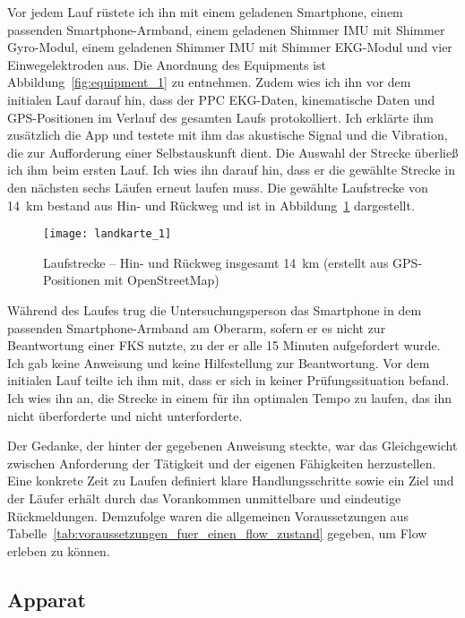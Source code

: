 Vor jedem Lauf rüstete ich ihn mit einem geladenen Smartphone, einem passenden Smartphone-Armband, einem geladenen Shimmer \ac{IMU} mit Shimmer Gyro-Modul, einem geladenen Shimmer \ac{IMU} mit Shimmer \ac{EKG}-Modul und vier Einwegelektroden aus. Die Anordnung des Equipments ist Abbildung~\ref{fig:equipment_1} zu entnehmen. Zudem wies ich ihn vor dem initialen Lauf darauf hin, dass der \ac{PPC} \ac{EKG}-Daten, kinematische Daten und \acs{GPS}-Positionen im Verlauf des gesamten Laufs protokolliert. Ich erklärte ihm zusätzlich die App und testete mit ihm das akustische Signal und die Vibration, die zur Aufforderung einer Selbstauskunft dient. Die Auswahl der Strecke überließ ich ihm beim ersten Lauf. Ich wies ihn darauf hin, dass er die gewählte Strecke in den nächsten sechs Läufen erneut laufen muss. Die gewählte Laufstrecke von 14~km bestand aus Hin- und Rückweg und ist in Abbildung~\ref{fig:landkarte_1} dargestellt. 
\begin{figure}
	[!htb] \centering 
	\texttt{[image: landkarte\_1]} \caption[Laufstrecke -- Hin- und Rückweg]{Laufstrecke -- Hin- und Rückweg insgesamt 14~km (erstellt aus \acs{GPS}-Positionen mit OpenStreetMap)} \label{fig:landkarte_1} 
\end{figure}

Während des Laufes trug die Untersuchungsperson das Smartphone in dem passenden Smartphone-Armband am Oberarm, sofern er es nicht zur Beantwortung einer \ac{FKS} nutzte, zu der er alle 15 Minuten aufgefordert wurde. Ich gab keine Anweisung und keine Hilfestellung zur Beantwortung. Vor dem initialen Lauf teilte ich ihm mit, dass er sich in keiner Prüfungssituation befand. Ich wies ihn an, die Strecke in einem für ihn optimalen Tempo zu laufen, das ihn nicht überforderte und nicht unterforderte. 

Der Gedanke, der hinter der gegebenen Anweisung steckte, war das Gleichgewicht zwischen Anforderung der Tätigkeit und der eigenen Fähigkeiten herzustellen. Eine konkrete Zeit zu Laufen definiert klare Handlungsschritte sowie ein Ziel und der Läufer erhält durch das Vorankommen unmittelbare und eindeutige Rückmeldungen. Demzufolge waren die allgemeinen Voraussetzungen aus Tabelle~\ref{tab:voraussetzungen_fuer_einen_flow_zustand} gegeben, um Flow erleben zu können. 

\subsection{Apparat} 

